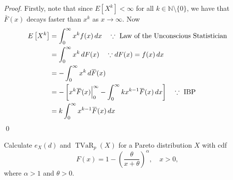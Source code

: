 \documentclass[notoc,notitlepage]{tufte-book}
\DeclareMathOperator{\TVaR}{TVaR}
\begin{document}
\begin{proof}
  Firstly, note that since $E[X^k] < \infty$ for all $k \in \mathbb{N} \setminus \{0\}$, we have that $\bar{F}(x)$ decays faster than $x^k$ as $x \to \infty$. Now
  \begin{align*}
    E\left[ X^k \right] &= \int_{0}^{\infty} x^k f(x) \dif{x} \quad \because \text{ Law of the Unconscious Statistician} \\
                        &= \int_{0}^{\infty} x^k \dif{F(x)} \quad \because \dif{F(x)} = f(x) \dif{x} \\
                        &= - \int_{0}^{\infty} x^k \dif{\bar{F}(x)} \\
                        &= - \left[ x^k \bar{F}(x) \at{0}{\infty} - \int_{0}^{\infty} kx^{k - 1} \bar{F}(x) \dif{x} \right] \quad \because \text{ IBP } \\
                        &= k \int_{0}^{\infty} x^{k - 1} \bar{F}(x) \dif{x}
  \end{align*}\qed\
\end{proof}

\begin{eg}
  Calculate $e_X(d)$ and $\TVaR_p(X)$ for a Pareto distribution $X$ with cdf
  \begin{equation*}
    F(x) = 1 - {\left( \frac{\theta}{x + \theta} \right)}^\alpha, \quad x > 0,
  \end{equation*}
  where $\alpha > 1$ and $\theta > 0$.
\end{eg}
\end{document}
